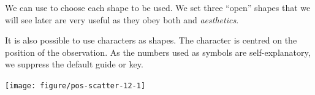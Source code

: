 \documentclass[krantz2]{krantz}\usepackage{knitr}%
\begin{document}
We can use  to choose each shape to be used. We set three ``open'' shapes that we will see later are very useful as they obey both  and  \emph{aesthetics}.\label{chunk:filled:symbols}

\begin{knitrout}\footnotesize
{}\color{fgcolor}\begin{kframe}
\begin{alltt}
\hlstd{(}  \hlstd{(}     \hlstd{=}  \hlopt{+}
  \hlstd{()} \hlopt{+}
  \hlstd{(} \hlstd{=} \hlstd{(}\hlstd{,} \hlstd{,} \hlstd{))}
\end{alltt}
\end{kframe}
\end{knitrout}

It is also possible to use characters as shapes. The character is centred on the position of the observation. As the numbers used as symbols are self-explanatory, we suppress the default guide or key.\label{chunk:plot:point:char}

\begin{knitrout}\footnotesize
{}\color{fgcolor}\begin{kframe}
\begin{alltt}
\hlstd{(}  \hlstd{(}     \hlstd{=}  \hlopt{+}
  \hlstd{(} \hlstd{=} \hlstd{)} \hlopt{+}
  \hlstd{(} \hlstd{=} \hlstd{(}\hlstd{,} \hlstd{,} \hlstd{),}  \hlstd{=} \hlstd{)}
\end{alltt}
\end{kframe}

{\centering \texttt{[image: figure/pos-scatter-12-1]} 

}



\end{knitrout}
\end{document}

